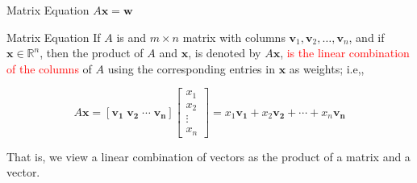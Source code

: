 \documentclass[10pt, aspectratio=169]{beamer}
\begin{document}
\begin{frame}{Matrix Equation \(A\mathbf{x}=\mathbf{w}\)}
    \begin{definition}{Matrix Equation}
        If \(A\) is and \(m\times n\) matrix with columns \(\mathbf{v}_1, \mathbf{v}_2,\ldots,\mathbf{v}_n\),
        and if \(\mathbf{x}\in\mathbb{R}^n\), then the product of $A$ and $\mathbf{x}$, is denoted by \(A\mathbf{x}\), 
        \textcolor{red}{is the linear combination of the columns} of \(A\) using the corresponding entries in \(\mathbf{x}\) as weights; i.e,,

        \[
    A\mathbf{x} = [\mathbf{v_1} \; \mathbf{v_2} \; \cdots \; \mathbf{v_n}]
       \begin{bmatrix}
           x_1\\
           x_2\\
           \vdots\\
           x_n
       \end{bmatrix}
       =
       x_1\mathbf{v_1} + x_2\mathbf{v_2} + \cdots + x_n\mathbf{v_n}
    \]
    \end{definition}
    That is, we view a linear combination of vectors as the product of a matrix and a vector.

    
\end{frame}
\end{document}
